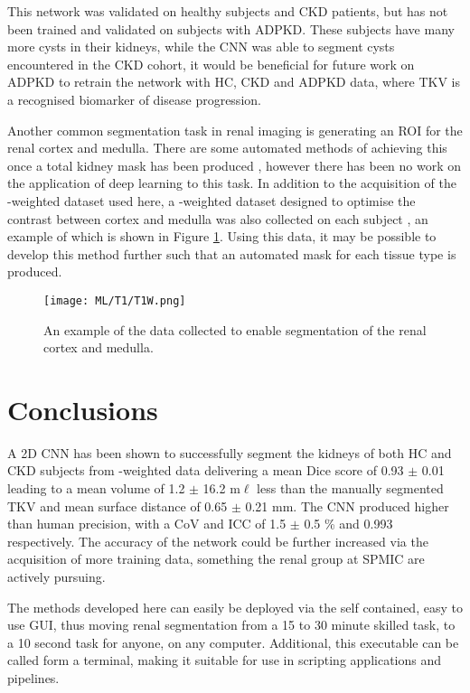 This network was validated on healthy subjects and \ac{CKD} patients, but has not been trained and validated on subjects with \ac{ADPKD}. These subjects have many more cysts in their kidneys, while the \ac{CNN} was able to segment cysts encountered in the \ac{CKD} cohort, it would be beneficial for future work on \ac{ADPKD} to retrain the network with \ac{HC}, \ac{CKD} and \ac{ADPKD} data, where \ac{TKV} is a recognised biomarker of disease progression.

Another common segmentation task in renal imaging is generating an \ac{ROI} for the renal cortex and medulla. There are some automated methods of achieving this once a total kidney mask has been produced \cite{cox_multiparametric_2017, morris_segmentation_2019}, however there has been no work on the application of deep learning to this task. In addition to the acquisition of the \ttwo-weighted dataset used here, a \tone-weighted dataset designed to optimise the contrast between cortex and medulla was also collected on each subject \cite{will_automated_2014}, an example of which is shown in Figure \ref{fig:ml_t1}. Using this data, it may be possible to develop this method further such that an automated mask for each tissue type is produced. 

\begin{figure}[H]
	\centering
	\texttt{[image: ML/T1/T1W.png]}
	\caption{An example of the data collected to enable segmentation of the renal cortex and medulla.}
	\label{fig:ml_t1}
\end{figure}

\newpage

\section{Conclusions}

A 2D \ac{CNN} has been shown to successfully segment the kidneys of both \ac{HC} and \ac{CKD} subjects from \ttwo-weighted data delivering a mean Dice score of 0.93 $\pm$ 0.01 leading to a mean volume of 1.2 $\pm$ 16.2 m$\ell$ less than the manually segmented \ac{TKV} and mean surface distance of 0.65 $\pm$ 0.21 mm. The \ac{CNN} produced higher than human precision, with a \ac{CoV} and \ac{ICC} of 1.5 $\pm$ 0.5 \% and 0.993 respectively. The accuracy of the network could be further increased via the acquisition of more training data, something the renal group at \ac{SPMIC} are actively pursuing. 

The methods developed here can easily be deployed via the self contained, easy to use \ac{GUI}, thus moving renal segmentation from a 15 to 30 minute skilled task, to a 10 second task for anyone, on any computer. Additional, this executable can be called form a terminal, making it suitable for use in scripting applications and pipelines.

